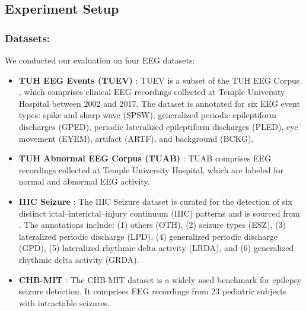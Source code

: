\subsection{Experiment Setup}
\subsubsection{Datasets:} We conducted our evaluation on four EEG datasets:
\begin{itemize}[leftmargin=*]
\item\textbf{TUH EEG Events (TUEV)} \cite{harati2015improved}: TUEV is a subset of the TUH EEG Corpus \cite{obeid2016temple}, which comprises clinical EEG recordings collected at Temple University Hospital between 2002 and 2017. The dataset is annotated for six EEG event types: spike and sharp wave (SPSW), generalized periodic epileptiform discharges (GPED), periodic lateralized epileptiform discharges (PLED), eye movement (EYEM), artifact (ARTF), and background (BCKG). 

\item\textbf{TUH Abnormal EEG Corpus (TUAB)} \cite{lopez2015automated}: TUAB comprises EEG recordings collected at Temple University Hospital, which are labeled for normal and abnormal EEG activity. 




\item\textbf{IIIC Seizure} \cite{jing2023development,ge2021deep}: The IIIC Seizure dataset is curated for the detection of six distinct ictal–interictal–injury continuum (IIIC) patterns and is sourced from \cite{jing2023development,ge2021deep}. The annotations include: (1) others (OTH), (2) seizure types (ESZ), (3) lateralized periodic discharge (LPD), (4) generalized periodic discharge (GPD), (5) lateralized rhythmic delta activity (LRDA), and (6) generalized rhythmic delta activity (GRDA). 



\item\textbf{CHB-MIT} \cite{shoeb2009application}: The CHB-MIT dataset is a widely used benchmark for epilepsy seizure detection. It comprises EEG recordings from 23 pediatric subjects with intractable seizures. 




\end{itemize}

